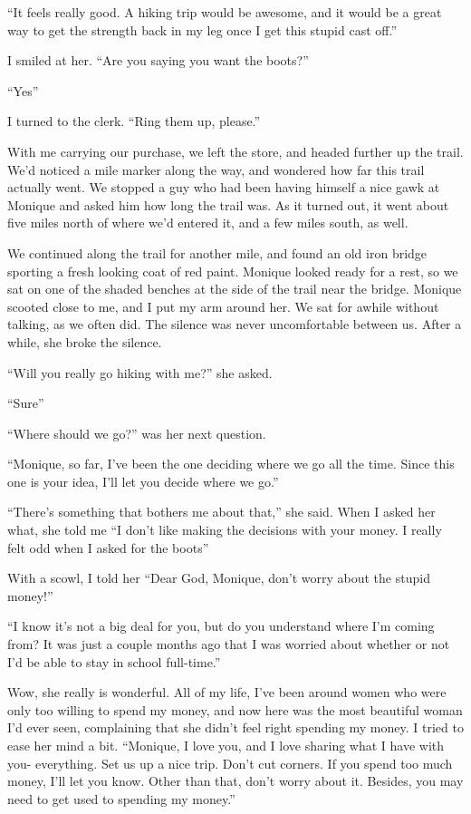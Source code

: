 ``It feels really good. A hiking trip would be awesome, and it would be a great way to get
the strength back in my leg once I get this stupid cast off.''

I smiled at her. ``Are you saying you want the boots?''

``Yes''

I turned to the clerk. ``Ring them up, please.''

With me carrying our purchase, we left the store, and headed further up the trail. We'd
noticed a mile marker along the way, and wondered how far this trail actually went. We stopped a
guy who had been having himself a nice gawk at Monique and asked him how long the trail was. As
it turned out, it went about five miles north of where we'd entered it, and a few miles south,
as well.

We continued along the trail for another mile, and found an old iron bridge sporting a
fresh looking coat of red paint. Monique looked ready for a rest, so we sat on one of the shaded
benches at the side of the trail near the bridge. Monique scooted close to me, and I put my arm
around her. We sat for awhile without talking, as we often did. The silence was never
uncomfortable between us. After a while, she broke the silence.

``Will you really go hiking with me?'' she asked.

``Sure''

``Where should we go?'' was her next question.

``Monique, so far, I've been the one deciding where we go all the time. Since this one is
your idea, I'll let you decide where we go.''

``There's something that bothers me about that,'' she said. When I asked her what, she told
me ``I don't like making the decisions with your money. I really felt odd when I asked for the
boots''

With a scowl, I told her ``Dear God, Monique, don't worry about the stupid money!''

``I know it's not a big deal for you, but do you understand where I'm coming from? It was
just a couple months ago that I was worried about whether or not I'd be able to stay in school
full-time.''

Wow, she really is wonderful. All of my life, I've been around women who were only too
willing to spend my money, and now here was the most beautiful woman I'd ever seen, complaining
that she didn't feel right spending my money. I tried to ease her mind a bit. ``Monique, I love
you, and I love sharing what I have with you- everything. Set us up a nice trip. Don't cut
corners. If you spend too much money, I'll let you know. Other than that, don’t worry about it.
Besides, you may need to get used to spending my money.''

